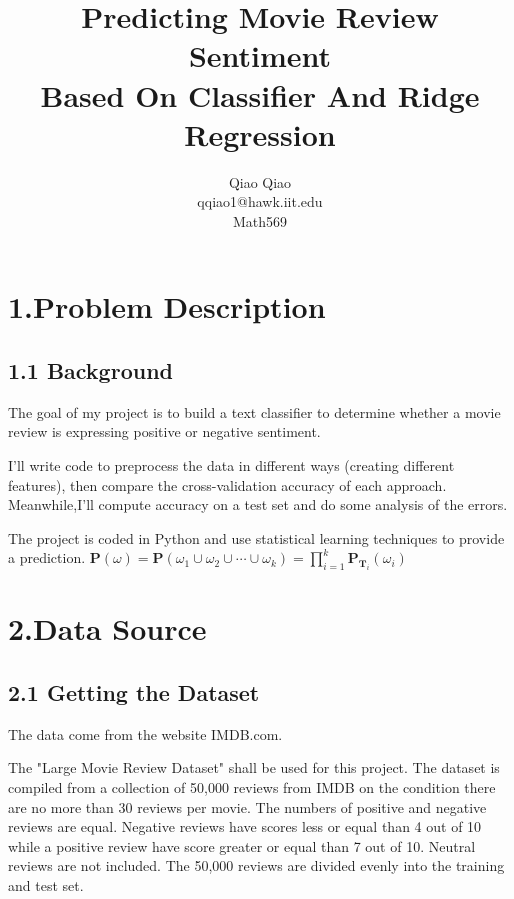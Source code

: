 \documentclass[11pt]{article}
\begin{document}
\title{Predicting Movie Review Sentiment \\
Based On Classifier And Ridge Regression}
\author{Qiao Qiao\\qqiao1@hawk.iit.edu\\Math569}
\maketitle
\newpage

\section*{1.Problem Description}
\subsection*{1.1 Background}
\hspace{1.5em}The goal of my project is to build a text classifier to determine whether a movie review is expressing positive or negative sentiment.

I'll write code to preprocess the data in different ways (creating different features), then compare the cross-validation accuracy of each approach. Meanwhile,I'll compute accuracy on a test set and do some analysis of the errors.

The project is coded in Python and use statistical learning techniques to provide a prediction. 
$\mathbf{P}(\omega)=\mathbf{P}\left(\omega_{1} \cup \omega_{2} \cup \cdots \cup \omega_{k}\right)=\prod_{i=1}^{k} \mathbf{P}_{\mathbf{T}_{i}}\left(\omega_{i}\right)$

\section*{2.Data Source}
\subsection*{2.1 Getting the Dataset}
\hspace{1.5em}The data come from the website IMDB.com.

The "Large Movie Review Dataset" shall be used for this project. The dataset is compiled from a collection of 50,000 reviews from IMDB on the condition there are no more than 30 reviews per movie. The numbers of positive and negative reviews are equal. Negative reviews have scores less or equal than 4 out of 10 while a positive review have score greater or equal than 7 out of 10. Neutral reviews are not included. The 50,000 reviews are divided evenly into the training and test set.
\end{document}
